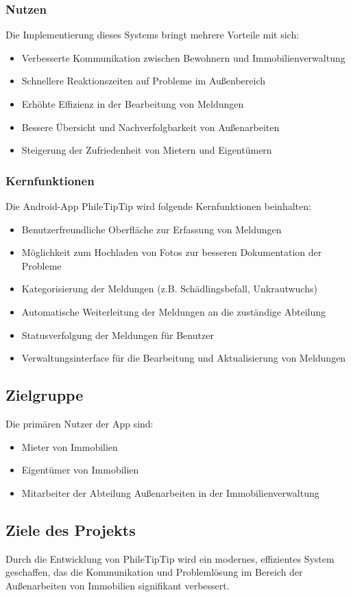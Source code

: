 \subsubsection{Nutzen}

Die Implementierung dieses Systems bringt mehrere Vorteile mit sich:
\begin{itemize}
  \item  Verbesserte Kommunikation zwischen Bewohnern und Immobilienverwaltung
  \item  Schnellere Reaktionszeiten auf Probleme im Außenbereich
  \item  Erhöhte Effizienz in der Bearbeitung von Meldungen
  \item  Bessere Übersicht und Nachverfolgbarkeit von Außenarbeiten
  \item  Steigerung der Zufriedenheit von Mietern und Eigentümern
\end{itemize}

\subsubsection{Kernfunktionen}

Die Android-App PhileTipTip wird folgende Kernfunktionen beinhalten:
\begin{itemize}
  \item  Benutzerfreundliche Oberfläche zur Erfassung von Meldungen
  \item  Möglichkeit zum Hochladen von Fotos zur besseren Dokumentation der Probleme
  \item  Kategorisierung der Meldungen (z.B. Schädlingsbefall, Unkrautwuchs)
  \item  Automatische Weiterleitung der Meldungen an die zuständige Abteilung
  \item  Statusverfolgung der Meldungen für Benutzer
  \item  Verwaltungsinterface für die Bearbeitung und Aktualisierung von Meldungen
\end{itemize}

\subsection{Zielgruppe}

Die primären Nutzer der App sind:
\begin{itemize}
  \item  Mieter von Immobilien
  \item  Eigentümer von Immobilien
  \item  Mitarbeiter der Abteilung Außenarbeiten in der Immobilienverwaltung
\end{itemize}

\subsection{Ziele des Projekts}

Durch die Entwicklung von PhileTipTip wird ein modernes, effizientes System geschaffen, das die Kommunikation und Problemlösung im Bereich der Außenarbeiten von Immobilien signifikant verbessert.

\newpage